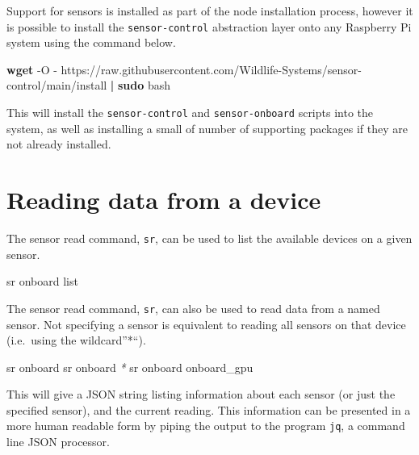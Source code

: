 \documentclass[
]{book}
\newenvironment{Shaded}{\begin{snugshade}}{\end{snugshade}}
\newcommand{\AttributeTok}[1]{\textcolor[rgb]{0.13,0.29,0.53}{#1}}
\newcommand{\ExtensionTok}[1]{#1}
\newcommand{\FunctionTok}[1]{\textcolor[rgb]{0.13,0.29,0.53}{\textbf{#1}}}
\newcommand{\KeywordTok}[1]{\textcolor[rgb]{0.13,0.29,0.53}{\textbf{#1}}}
\newcommand{\NormalTok}[1]{#1}
\newcommand{\PreprocessorTok}[1]{\textcolor[rgb]{0.56,0.35,0.01}{\textit{#1}}}
\begin{document}
Support for sensors is installed as part of the node installation process, however it is possible to install the \texttt{sensor-control} abstraction layer onto any Raspberry Pi system using the command below.

\begin{Shaded}
\begin{Highlighting}[]
\FunctionTok{wget} \AttributeTok{{-}O} \AttributeTok{{-}}\NormalTok{ https://raw.githubusercontent.com/Wildlife{-}Systems/sensor{-}control/main/install }\KeywordTok{|} \FunctionTok{sudo}\NormalTok{ bash}
\end{Highlighting}
\end{Shaded}

This will install the \texttt{sensor-control} and \texttt{sensor-onboard} scripts into the system, as well as installing a small of number of supporting packages if they are not already installed.

\section{Reading data from a device}\label{reading-data-from-a-device}

The sensor read command, \texttt{sr}, can be used to list the available devices on a given sensor.

\begin{Shaded}
\begin{Highlighting}[]
\ExtensionTok{sr}\NormalTok{ onboard list}
\end{Highlighting}
\end{Shaded}

The sensor read command, \texttt{sr}, can also be used to read data from a named sensor. Not specifying a sensor is equivalent to reading all sensors on that device (i.e.~using the wildcard''*``).

\begin{Shaded}
\begin{Highlighting}[]
\ExtensionTok{sr}\NormalTok{ onboard}
\ExtensionTok{sr}\NormalTok{ onboard }\PreprocessorTok{*}
\ExtensionTok{sr}\NormalTok{ onboard onboard\_gpu}
\end{Highlighting}
\end{Shaded}

This will give a JSON string listing information about each sensor (or just the specified sensor), and the current reading. This information can be presented in a more human readable form by piping the output to the program \texttt{jq}, a command line JSON processor.
\end{document}

